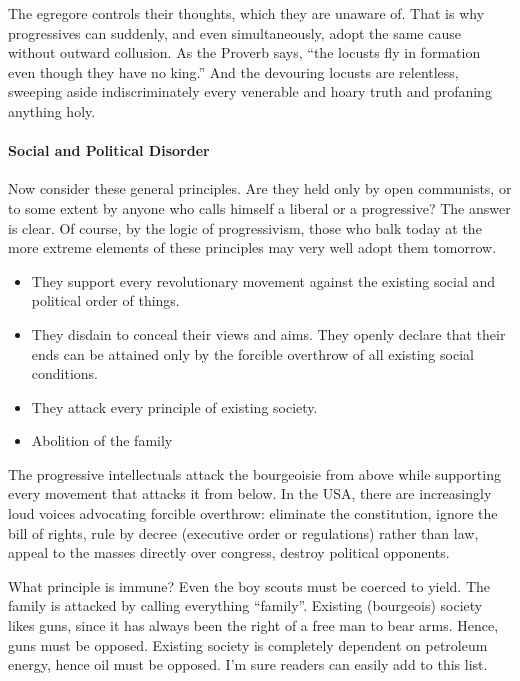 The egregore controls their thoughts, which they are unaware of. That is why progressives can suddenly, and even simultaneously, adopt the same cause without outward collusion. As the Proverb says, ``the locusts fly in formation even though they have no king.'' And the devouring locusts are relentless, sweeping aside indiscriminately every venerable and hoary truth and profaning anything holy.

\paragraph{Social and Political Disorder}


Now consider these general principles. Are they held only by open communists, or to some extent by anyone who calls himself a liberal or a progressive? The answer is clear. Of course, by the logic of progressivism, those who balk today at the more extreme elements of these principles may very well adopt them tomorrow.

\begin{itemize}


\item They support every revolutionary movement against the existing social and political order of things.

\item They disdain to conceal their views and aims. They openly declare that their ends can be attained only by the forcible overthrow of all existing social conditions.

\item They attack every principle of existing society.

\item Abolition of the family
\end{itemize}


The progressive intellectuals attack the bourgeoisie from above while supporting every movement that attacks it from below. In the USA, there are increasingly loud voices advocating forcible overthrow: eliminate the constitution, ignore the bill of rights, rule by decree (executive order or regulations) rather than law, appeal to the masses directly over congress, destroy political opponents.

What principle is immune? Even the boy scouts must be coerced to yield. The family is attacked by calling everything ``family''. Existing (bourgeois) society likes guns, since it has always been the right of a free man to bear arms. Hence, guns must be opposed. Existing society is completely dependent on petroleum energy, hence oil must be opposed. I'm sure readers can easily add to this list.

